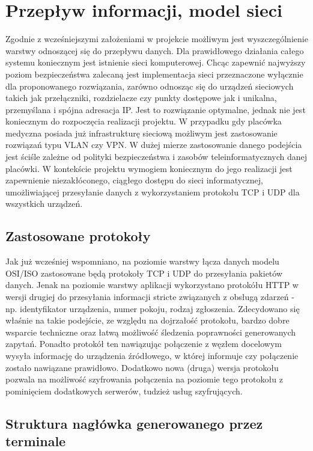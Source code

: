 \documentclass[12pt]{article} %
\begin{document}
\section{Przepływ informacji, model sieci}

Zgodnie z wcześniejszymi założeniami w projekcie możliwym jest wyszczególnienie warstwy odnoszącej się do przepływu danych. Dla prawidłowego działania całego systemu koniecznym jest istnienie sieci komputerowej. Chcąc zapewnić najwyższy poziom bezpieczeństwa zalecaną jest implementacja sieci przeznaczone wyłącznie dla proponowanego rozwiązania, zarówno odnosząc się do urządzeń sieciowych takich jak przełączniki, rozdzielacze czy punkty dostępowe jak i unikalna, przemyślana  i spójna adresacja IP. Jest to rozwiązanie optymalne, jednak nie jest koniecznym do rozpoczęcia realizacji projektu. W przypadku gdy placówka medyczna posiada już infrastrukturę sieciową możliwym jest zastosowanie rozwiązań typu VLAN czy VPN. W dużej mierze zastosowanie danego podejścia jest ściśle zależne od polityki bezpieczeństwa i zasobów teleinformatycznych danej placówki. W kontekście projektu wymogiem koniecznym do jego realizacji jest zapewnienie niezakłóconego, ciągłego dostępu do sieci informatycznej,  umożliwiającej przesyłanie danych z wykorzystaniem protokołu TCP i UDP dla wszystkich urządzeń.

\subsection{Zastosowane protokoły}

Jak już wcześniej wspomniano, na poziomie warstwy łącza danych modelu OSI/ISO zastosowane będą protokoły TCP i UDP do przesyłania pakietów danych. Jenak na poziomie warstwy aplikacji wykorzystano protokółu HTTP w wersji drugiej do przesyłania informacji stricte związanych z obsługą zdarzeń - np.  identyfikator urządzenia, numer pokoju, rodzaj zgłoszenia. Zdecydowano się właśnie na takie podejście, ze względu na dojrzałość protokołu, bardzo dobre wsparcie techniczne oraz łatwą możliwość śledzenia poprawności generowanych zapytań. Ponadto protokół ten nawiązując połączenie z węzłem docelowym wysyła informację do urządzenia źródłowego, w której informuje czy połączenie zostało nawiązane prawidłowo. Dodatkowo nowa (druga) wersja protokołu pozwala na możliwość szyfrowania połączenia na poziomie tego protokołu z pominięciem dodatkowych serwerów, tudzież usług szyfrujących.

\subsection{Struktura nagłówka generowanego przez terminale}
\end{document}
